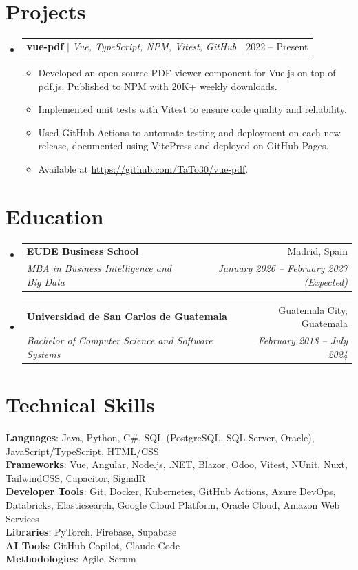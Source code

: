 \documentclass[letterpaper,11pt]{article}
\makeatletter
\newcommand{\resumeItem}[1]{
  \item\small{
    {#1 \vspace{-2pt}}
  }
}
\newcommand{\resumeSubheading}[4]{
  \vspace{-2pt}\item
    \begin{tabular*}{0.97\textwidth}[t]{l@{\extracolsep{\fill}}r}
      \textbf{#1} & #2 \\
      \textit{\small#3} & \textit{\small #4} \\
    \end{tabular*}\vspace{-7pt}
}
\newcommand{\resumeProjectHeading}[2]{
    \item
    \begin{tabular*}{0.97\textwidth}{l@{\extracolsep{\fill}}r}
      \small#1 & #2 \\
    \end{tabular*}\vspace{-7pt}
}
\newcommand{\resumeSubHeadingListStart}{\begin{itemize}[leftmargin=0.15in, label={}]}
\newcommand{\resumeSubHeadingListEnd}{\end{itemize}}
\newcommand{\resumeItemListStart}{\begin{itemize}}
\newcommand{\resumeItemListEnd}{\end{itemize}\vspace{-5pt}}
\makeatother
\begin{document}
\section{Projects}
  \resumeSubHeadingListStart
    \resumeProjectHeading
      {\textbf{vue-pdf} $|$ \emph{Vue, TypeScript, NPM, Vitest, GitHub}}{2022 -- Present}
      \resumeItemListStart
        \resumeItem{Developed an open-source PDF viewer component for Vue.js on top of pdf.js. Published to NPM with 20K+ weekly downloads.}
        \resumeItem{Implemented unit tests with Vitest to ensure code quality and reliability.}
        \resumeItem{Used GitHub Actions to automate testing and deployment on each new release, documented using VitePress and deployed on GitHub Pages.}
        \resumeItem{Available at \href{https://github.com/TaTo30/vue-pdf}{https://github.com/TaTo30/vue-pdf}.}
        \resumeItemListEnd
  \resumeSubHeadingListEnd

\section{Education}
  \resumeSubHeadingListStart
    \resumeSubheading
      {EUDE Business School}{Madrid, Spain}
      {MBA in Business Intelligence and Big Data}{January 2026 -- February 2027 (Expected)}
    \resumeSubheading
      {Universidad de San Carlos de Guatemala}{Guatemala City, Guatemala}
      {Bachelor of Computer Science and Software Systems}{February 2018 -- July 2024}
  \resumeSubHeadingListEnd

\section{Technical Skills}
 \begin{itemize}[leftmargin=0.15in, label={}]
    \small{\item{
     \textbf{Languages}{: Java, Python, C\#, SQL (PostgreSQL, SQL Server, Oracle), JavaScript/TypeScript, HTML/CSS} \\
     \textbf{Frameworks}{: Vue, Angular, Node.js, .NET, Blazor, Odoo, Vitest, NUnit, Nuxt, TailwindCSS, Capacitor, SignalR} \\
     \textbf{Developer Tools}{: Git, Docker, Kubernetes, GitHub Actions, Azure DevOps, Databricks, Elasticsearch, Google Cloud Platform, Oracle Cloud, Amazon Web Services} \\
     \textbf{Libraries}{: PyTorch, Firebase, Supabase} \\
     \textbf{AI Tools}{: GitHub Copilot, Claude Code} \\
     \textbf{Methodologies}{: Agile, Scrum}
    }}
 \end{itemize}

\end{document}
